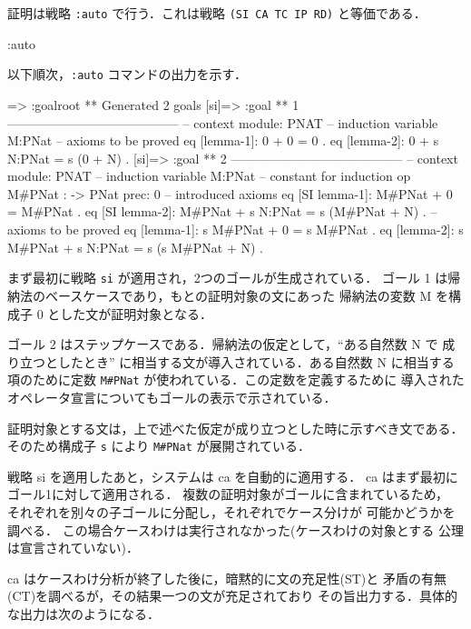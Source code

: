 \documentclass[a4paper,oneside,10pt,here]{memoir}
\newenvironment{vvtm}%
{\parskip=0pt\lineskip=0pt\begin{center}\begin{minipage}{0.8\textwidth}\begin{snugshade}}%
  {\end{snugshade}\end{minipage}\end{center}}
\begin{document}
証明は戦略 \texttt{:auto} で行う．これは戦略 \texttt{(SI CA TC IP RD)} と等価である．

\begin{vvtm}
\begin{simplev}
:auto 
\end{simplev}
\end{vvtm}

以下順次，\texttt{:auto} コマンドの出力を示す．
\begin{vvtm}
  \begin{simplev}
[si]=> :goal{root}
** Generated 2 goals
[si]=>
:goal { ** 1 -----------------------------------------
  -- context module: PNAT
  -- induction variable
    M:PNat
  -- axioms to be proved
    eq [lemma-1]: 0 + 0 = 0 .
    eq [lemma-2]: 0 + s N:PNat = s (0 + N) .
}
[si]=>
:goal { ** 2 -----------------------------------------
  -- context module: PNAT
  -- induction variable
    M:PNat
  -- constant for induction
    op M#PNat : -> PNat { prec: 0 }
  -- introduced axioms
    eq [SI lemma-1]: M#PNat + 0 = M#PNat .
    eq [SI lemma-2]: M#PNat + s N:PNat = s (M#PNat + N) .
  -- axioms to be proved
    eq [lemma-1]: s M#PNat + 0 = s M#PNat .
    eq [lemma-2]: s M#PNat + s N:PNat = s (s M#PNat + N) .
}
\end{simplev}
\end{vvtm}
まず最初に戦略 \texttt{si} が適用され，2つのゴールが生成されている．
ゴール 1 は帰納法のベースケースであり，もとの証明対象の文にあった
帰納法の変数 M を構成子 0 とした文が証明対象となる．

ゴール 2 はステップケースである．帰納法の仮定として，``ある自然数 N で
成り立つとしたとき'' に相当する文が導入されている．ある自然数 N に相当する
項のために定数 \verb|M#PNat| が使われている．この定数を定義するために
導入されたオペレータ宣言についてもゴールの表示で示されている．

証明対象とする文は，上で述べた仮定が成り立つとした時に示すべき文である．
そのため構成子 \texttt{s} により \verb|M#PNat| が展開されている．

戦略 si を適用したあと，システムは ca を自動的に適用する．
ca はまず最初にゴール1に対して適用される．
複数の証明対象がゴールに含まれているため，
それぞれを別々の子ゴールに分配し，それぞれでケース分けが
可能かどうかを調べる．
この場合ケースわけは実行されなかった(ケースわけの対象とする
公理は宣言されていない)．

ca はケースわけ分析が終了した後に，暗黙的に文の充足性(ST)と
矛盾の有無(CT)を調べるが，その結果一つの文が充足されており
その旨出力する．具体的な出力は次のようになる．
\end{document}
